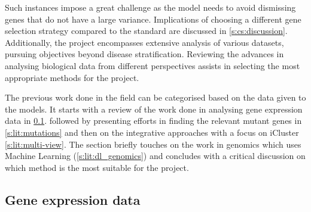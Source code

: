 Such instances impose a great challenge as the model needs to avoid dismissing genes that do not have a large variance. Implications of choosing a different gene selection strategy compared to the standard are discussed in \cref{s:cs:discussion}. Additionally, the project encompasses extensive analysis of various datasets, pursuing objectives beyond disease stratification. Reviewing the advances in analysing biological data from different perspectives assists in selecting the most appropriate methods for the project.


The previous work done in the field can be categorised based on the data given to the models. It starts with a review of the work done in analysing gene expression data in \ref{s:lit:rnaSeq}. followed by presenting efforts in finding the relevant mutant genes in \ref{s:lit:mutations} and then on the integrative approaches with a focus on iCluster \ref{s:lit:multi-view}. The section briefly touches on the work in genomics which uses Machine Learning (\ref{s:lit:dl_genomics}) and concludes with a critical discussion on which method is the most suitable for the project.

\subsection{Gene expression data} \label{s:lit:rnaSeq}

\vspace{3mm}
\vspace{3mm}

